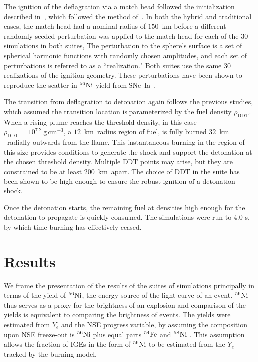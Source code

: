 \documentclass[preprint2]{aastex63}
\newcommand{\SNeIa}{SNe~Ia}
\newcommand{\Ni}[1]{\ensuremath{{}^{#1}{\rm Ni}}}
\newcommand{\Fe}[1]{\ensuremath{{}^{#1}{\rm Fe}}}
\newcommand{\unitspace}{\ensuremath{\,}}
\newcommand{\usp}{\unitspace}
\newcommand{\unitstyle}[1]{\ensuremath{\mathrm{#1}}}
\newcommand{\power}[2]{\ensuremath{{#1}^{#2}}}
\newcommand{\centi}{\unitstyle{c}}
\newcommand{\kilo}{\unitstyle{k}}
\newcommand{\meter}{\unitstyle{m}}
\newcommand{\cm}{\centi\meter}
\newcommand{\gram}{\unitstyle{g}}
\newcommand{\grampercc}{\gram\usp\power{\cm}{-3}} %
\newcommand{\km}{\kilo\meter}   %
\begin{document}
The ignition of the deflagration via a match head followed the
initialization described in~\citet{Kruegeretal2012}, which
followed the method of~\citet{townetal2009}.
In both the hybrid and traditional cases, the match head had a
nominal radius of $150$~km before
a different randomly-seeded perturbation was applied to the
match head for each of the 30 simulations in both suites,
The perturbation to the sphere's surface is a set of
spherical harmonic functions with randomly chosen amplitudes, and
each set of perturbations is referred to as a ``realization."
Both suites use the same 30 realizations of the ignition geometry.
These perturbations have been shown to reproduce
the scatter in \Ni{56}
yield from \SNeIa\ \citep{townetal2009}.


The transition from deflagration to detonation again follows
the previous studies, which assumed the transition location
is parameterized by the fuel density $\rho_{\mathrm{DDT}}$.
When a rising plume reaches the threshold density, in this case $\rho_{\mathrm{DDT}} = 10^{7.2}~\grampercc$, a $12$~\km\ radius region of fuel, is fully burned $32$~\km\ radially outwards from the flame.
This
instantaneous burning in the region of this size provides conditions
to generate the shock and support the detonation at the chosen
threshold density.  Multiple DDT points may arise, but they are
constrained to be at least $200$~\km\ apart. The choice of DDT
in the suite has been shown to be high enough to ensure
the robust ignition of a detonation shock.

Once the detonation starts, the remaining fuel at densities
high enough for the detonation to propagate is quickly consumed.
The simulations were run to 4.0 s, by which time burning
has effectively ceased.


\section{Results}

We frame the presentation of the results of the suites of simulations
principally in terms of the yield of \Ni{56}, the energy source of
the light curve of an event. \Ni{56} thus serves as a proxy
for the brightness of an explosion and comparison of the yields
is equivalent to comparing the brightness of events. The
yields were estimated from $Y_e$ and the NSE progress
variable, by assuming the composition upon NSE freeze-out is \Ni{56} plus equal
parts \Fe{54} and \Ni{58} \citep{townetal2009,Meaketal09}.
This assumption allows the fraction of IGEs in the form of \Ni{56} to be estimated from the $Y_e$ tracked by the burning model.
\end{document}
